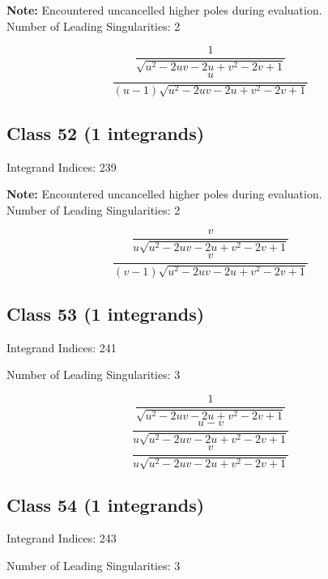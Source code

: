 \documentclass[11pt,a4paper]{article}
\begin{document}
\textbf{Note:} Encountered uncancelled higher poles during evaluation.\\[1em]

Number of Leading Singularities: 2

\begin{equation}
\frac{1}{\sqrt{u^2-2 u v-2 u+v^2-2 v+1}}
\end{equation}
\begin{equation}
\frac{u}{(u-1) \sqrt{u^2-2 u v-2 u+v^2-2 v+1}}
\end{equation}


\subsection*{Class 52 (1 integrands)}
Integrand Indices: 239

\textbf{Note:} Encountered uncancelled higher poles during evaluation.\\[1em]

Number of Leading Singularities: 2

\begin{equation}
\frac{v}{u \sqrt{u^2-2 u v-2 u+v^2-2 v+1}}
\end{equation}
\begin{equation}
\frac{v}{(v-1) \sqrt{u^2-2 u v-2 u+v^2-2 v+1}}
\end{equation}


\subsection*{Class 53 (1 integrands)}
Integrand Indices: 241

Number of Leading Singularities: 3

\begin{equation}
\frac{1}{\sqrt{u^2-2 u v-2 u+v^2-2 v+1}}
\end{equation}
\begin{equation}
\frac{u-v}{u \sqrt{u^2-2 u v-2 u+v^2-2 v+1}}
\end{equation}
\begin{equation}
\frac{v}{u \sqrt{u^2-2 u v-2 u+v^2-2 v+1}}
\end{equation}


\subsection*{Class 54 (1 integrands)}
Integrand Indices: 243

Number of Leading Singularities: 3
\end{document}
